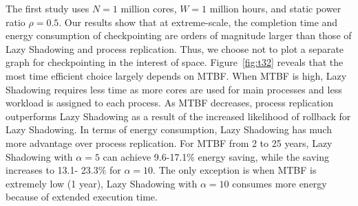 
The first study uses $N=1$ million cores, %
$W=1$ million hours, and static power ratio $\rho=0.5$.
Our results show that at extreme-scale, the completion time and energy consumption of checkpointing are orders of magnitude larger than those of Lazy Shadowing and process replication. Thus, we choose not to plot a separate graph for checkpointing in the interest of space. 
Figure~\ref{fig:t32} reveals that the most time efficient choice largely depends on MTBF. 
When MTBF is high, Lazy Shadowing requires less time as more cores are used for main processes and less workload is assigned to each process. As MTBF decreases, process replication outperforms Lazy Shadowing as a result of the increased likelihood of rollback for Lazy Shadowing.
In terms of energy consumption, Lazy Shadowing has much more advantage over process replication. For MTBF from 2 to 25 years, Lazy Shadowing with $\alpha=5$ can achieve 9.6-17.1\% energy saving, while the saving increases to 13.1- 23.3\% for $\alpha=10$. The only exception is when MTBF is extremely low (1 year), Lazy Shadowing with $\alpha=10$ consumes more energy because of extended execution time.

